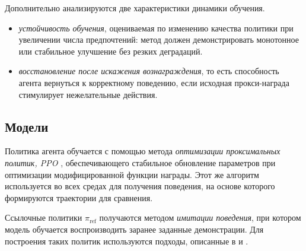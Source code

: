 Дополнительно анализируются две характеристики динамики обучения.
\begin{itemize}
    \item  \emph{устойчивость обучения}, оцениваемая по изменению качества 
политики при увеличении числа предпочтений: метод должен демонстрировать 
монотонное или стабильное улучшение без резких деградаций.
    \item \emph{восстановление после искажения вознаграждения}, то есть 
    способность агента вернуться к корректному поведению, если исходная 
    прокси-награда стимулирует нежелательные действия.
\end{itemize} 


\subsection{Модели}

Политика агента обучается с помощью метода \emph{оптимизации проксимальных 
политик, PPO} \cite{schulman2017ppo}, обеспечивающего стабильное обновление 
параметров при оптимизации модифицированной функции награды. Этот же алгоритм 
используется во всех средах для получения поведения, на основе которого 
формируются траектории для сравнения.

Ссылочные политики $\pi_{\text{ref}}$ получаются методом 
\emph{имитации поведения}, при котором модель обучается воспроизводить 
заранее заданные демонстрации. Для построения таких политик используются 
подходы, описанные в \cite{treiber2000idm} и \cite{willis1999pid}.

